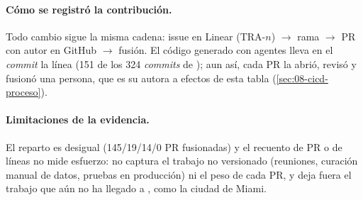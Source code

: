 \paragraph{Cómo se registró la contribución.} Todo cambio sigue la misma cadena: issue en Linear
(TRA-$n$) $\rightarrow$ rama  $\rightarrow$ PR con autor en GitHub
$\rightarrow$ fusión. El código generado con agentes lleva en el \emph{commit} la línea
 (151 de los 324 \emph{commits} de ); aun así, cada PR la
abrió, revisó y fusionó una persona, que es su autora a efectos de esta tabla
(\cref{sec:08-cicd-proceso}).

\paragraph{Limitaciones de la evidencia.} El reparto es desigual (145/19/14/0 PR fusionadas) y el
recuento de PR o de líneas no mide esfuerzo: no captura el trabajo no versionado (reuniones,
curación manual de datos, pruebas en producción) ni el peso de cada PR, y deja fuera el trabajo
que aún no ha llegado a , como la ciudad de Miami.
